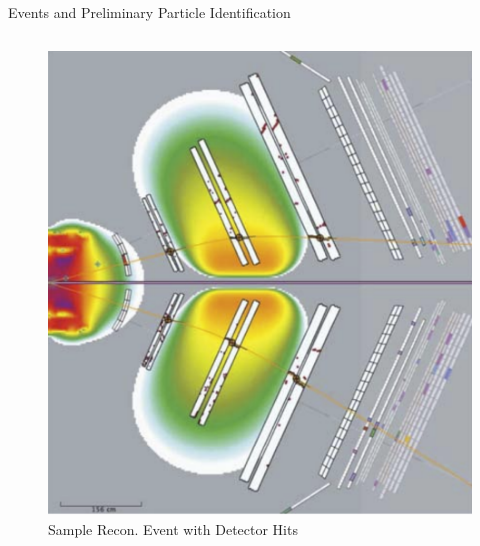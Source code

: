 \documentclass[aspectratio=169]{beamer}
\begin{document}
\begin{frame}{Events and Preliminary Particle Identification} \label{frame:datasets2}
        \vspace{-0.5cm}
        \begin{columns}[t, onlytextwidth]
                \begin{figure}[t!]
                    \includegraphics[width=.76349\textwidth]{midana/example_event.png}
                    \caption{ Sample Recon. Event with Detector Hits}
                    
                \end{figure}
                \vspace{-0.45cm}
                

\end{columns}
\end{frame}
\end{document}

